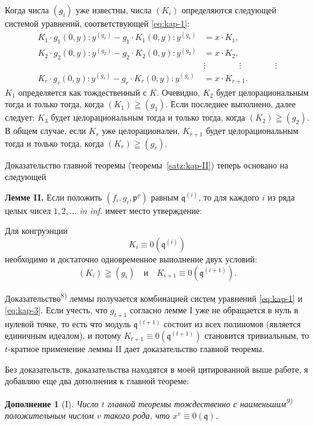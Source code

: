 \documentclass[11pt]{article}
\theoremstyle{plain}
\newtheorem{zusatz}{Дополнение}
\begin{document}
Когда числа $(g_{i})$ уже известны, числа $(K_{i})$ определяются
следующей системой уравнений, соответствующей \eqref{eq:kap-1}:
\begin{equation}\label{eq:kap-3}
\begin{aligned}
K_1\cdot g_1(0,y):y^{(g_1)} - g_1\cdot K_1(0,y):y^{(g_1)} &= x\cdot K_1,\\
K_2\cdot g_2(0,y):y^{(g_2)} - g_2\cdot K_2(0,y):y^{(g_2)} &= x\cdot K_2,\\
&\vdots \qquad\qquad\vdots\qquad\qquad\vdots\\
K_{r}\cdot g_{r}(0,y):y^{(g_{r})} - g_{r}\cdot K_{r}(0,y):y^{(g_{r})} &= x\cdot K_{r+1}.
\end{aligned}
\end{equation}
$K_{1}$ определяется как тождественный с $K$. Очевидно, $K_{2}$ будет
целорациональным тогда и только тогда, когда $(K_1)\geqq(g_1)$.
Если последнее выполнено, далее следует: $K_{3}$ будет
целорациональным тогда и только тогда, когда $(K_2)\geqq(g_2)$.
В общем случае, если $K_{r}$ уже целорационален, $K_{r+1}$ будет
целорациональным тогда и только тогда, когда $(K_r)\geqq(g_r)$.

Доказательство главной теоремы (теоремы~\ref{satz:kap-II}) теперь
основано на следующей

\smallskip
\textbf{Лемме II.} Если положить
$(f_i,g_i,\mathfrak{p}^\varrho)$ равным $\mathfrak{q}^{(i)}$, то для
каждого $i$ из ряда целых чисел $1, 2, \ldots$ \textit{in inf.}
имеет место утверждение:

Для конгруэнции
\[
K_{i} \equiv 0(\mathfrak{q}^{(i)})
\]
необходимо и достаточно одновременное выполнение двух условий:
\[
(K_i)\geqq(g_i)\quad \text{и}\quad K_{i+1}\equiv0(\mathfrak{q}^{(i+1)}).
\]

Доказательство\textsuperscript{8)} леммы получается комбинацией
систем уравнений \eqref{eq:kap-1} и \eqref{eq:kap-3}. Если учесть,
что $g_{t+1}$ согласно лемме I уже не обращается в нуль в нулевой
точке, то есть что модуль $\mathfrak{q}^{(t+1)}$ состоит из всех
полиномов (является единичным идеалом), и потому
$K_{t+1} \equiv 0(\mathfrak{q}^{(t+1)})$ становится тривиальным, то
$t$-кратное применение леммы II дает доказательство главной
теоремы.

\smallskip
Без доказательств, доказательства находятся в моей цитированной
выше работе, я добавляю еще два дополнения к главной теореме:

\begin{zusatz}[I]
Число $t$ главной теоремы тождественно с наименьшим\textsuperscript{9)}
положительным числом $v$ такого рода, что
$x^{v} \equiv 0(\mathfrak{q})$.
\end{zusatz}
\end{document}
